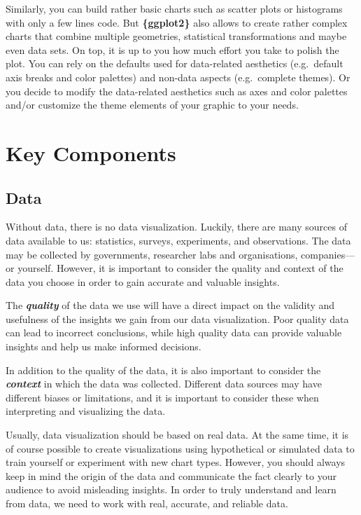 \documentclass[
]{krantz}
\begin{document}
Similarly, you can build rather basic charts such as scatter plots or histograms with only a few lines code. But \textbf{\{ggplot2\}} also allows to create rather complex charts that combine multiple geometries, statistical transformations and maybe even data sets. On top, it is up to you how much effort you take to polish the plot. You can rely on the defaults used for data-related aesthetics (e.g.~default axis breaks and color palettes) and non-data aspects (e.g.~complete themes). Or you decide to modify the data-related aesthetics such as axes and color palettes and/or customize the theme elements of your graphic to your needs.

\hypertarget{key-components}{%
\section{Key Components}\label{key-components}}

\hypertarget{data}{%
\subsection{Data}\label{data}}

Without data, there is no data visualization. Luckily, there are many sources of data available to us: statistics, surveys, experiments, and observations. The data may be collected by governments, researcher labs and organisations, companies---or yourself. However, it is important to consider the quality and context of the data you choose in order to gain accurate and valuable insights.

The \textbf{\emph{quality}} of the data we use will have a direct impact on the validity and usefulness of the insights we gain from our data visualization. Poor quality data can lead to incorrect conclusions, while high quality data can provide valuable insights and help us make informed decisions.

In addition to the quality of the data, it is also important to consider the \textbf{\emph{context}} in which the data was collected. Different data sources may have different biases or limitations, and it is important to consider these when interpreting and visualizing the data.

Usually, data visualization should be based on real data. At the same time, it is of course possible to create visualizations using hypothetical or simulated data to train yourself or experiment with new chart types. However, you should always keep in mind the origin of the data and communicate the fact clearly to your audience to avoid misleading insights. In order to truly understand and learn from data, we need to work with real, accurate, and reliable data.
\end{document}
